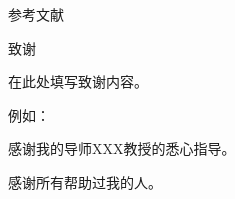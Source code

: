 \documentclass[12pt, a4paper]{article}
\begin{document}
\newpage
\begin{spacing}{1.25} %
{\centering \heiti{} 参考文献\par}\vspace* {-2\baselineskip}
\songti{}
\end{spacing}

\newpage
\begin{spacing}{1.25} %
{\centering \heiti{} 致谢\par}\vspace* {\baselineskip} %
\songti{} %
\noindent %
在此处填写致谢内容。

例如：

感谢我的导师XXX教授的悉心指导。

感谢所有帮助过我的人。
\end{spacing}
\end{document}
